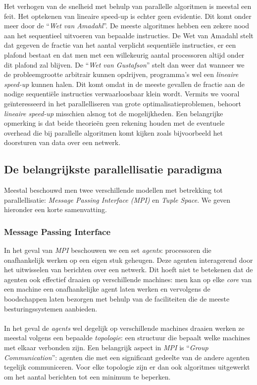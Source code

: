 Het verhogen van de snelheid met behulp van parallelle algoritmen is meestal een feit. Het optekenen van lineaire speed-up is echter geen evidentie. Dit komt onder meer door de ``\emph{Wet van Amadahl}''\cite{Amdahl:1967:VSP:1465482.1465560}. De meeste algoritmes hebben een zekere nood aan het sequentieel uitvoeren van bepaalde instructies. De Wet van Amadahl stelt dat gegeven de fractie van het aantal verplicht sequenti\"ele instructies, er een plafond bestaat en dat men met een willekeurig aantal processoren altijd onder dit plafond zal blijven. De ``\emph{Wet van Gustafson}''\cite{Gustafson:1988:RAL:42411.42415} stelt dan weer dat wanneer we de probleemgrootte arbitrair kunnen opdrijven, programma's wel een \emph{lineaire speed-up} kunnen halen. Dit komt omdat in de meeste gevallen de fractie aan de nodige sequenti\"ele instructies verwaarloosbaar klein wordt. Vermits we vooral ge\"interesseerd in het parallelliseren van grote optimalisatieproblemen, behoort \emph{lineaire speed-up} misschien alsnog tot de mogelijkheden. Een belangrijke opmerking is dat beide theorie\"en geen rekening houden met de eventuele overhead die bij parallelle algoritmen komt kijken zoals bijvoorbeeld het doorsturen van data over een netwerk.

\subsection{De belangrijkste parallellisatie paradigma}

Meestal beschouwd men twee verschillende modellen met betrekking tot parallellisatie: \emph{Message Passing Interface (MPI)} en \emph{Tuple Space}. We geven hieronder een korte samenvatting.

\subsubsection{Message Passing Interface}

In het geval van \emph{MPI} beschouwen we een set \emph{agents}: processoren die onafhankelijk werken op een eigen stuk geheugen. Deze agenten interagerend door het uitwisselen van berichten over een netwerk. Dit hoeft niet te betekenen dat de agenten ook effectief draaien op verschillende machines: men kan op elke \emph{core} van een machine een onafhankelijke agent laten werken en vervolgens de boodschappen laten bezorgen met behulp van de faciliteiten die de meeste besturingssystemen aanbieden.

\paragraph{}
In het geval de \emph{agents} wel degelijk op verschillende machines draaien werken ze meestal volgens een bepaalde \emph{topologie}: een structuur die bepaalt welke machines met elkaar verbonden zijn. Een belangrijk aspect in \emph{MPI} is ``\emph{Group Communication}'': agenten die met een significant gedeelte van de andere agenten tegelijk communiceren. Voor elke topologie zijn er dan ook algoritmes uitgewerkt om het aantal berichten tot een minimum te beperken.

